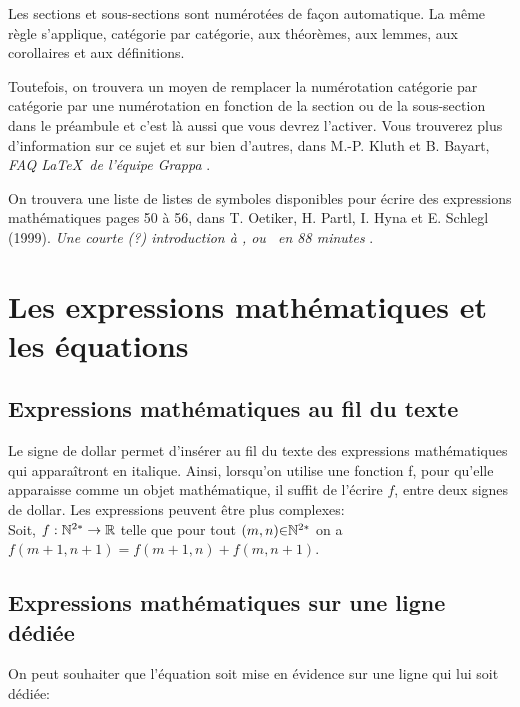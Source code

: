  
Les sections et sous-sections sont numérotées de façon automatique. La même règle s'applique, catégorie par catégorie, aux théorèmes, aux lemmes, aux corollaires et aux définitions.

Toutefois, on trouvera un moyen de remplacer la numérotation catégorie par catégorie par une numérotation en fonction de la section ou de la sous-section dans le préambule et c'est là aussi que vous devrez l'activer. Vous trouverez plus d'information sur ce sujet et sur bien d'autres, dans M.-P. Kluth et B. Bayart, {\em FAQ  \LaTeX~de l'équipe Grappa} \cite{faq}.

On trouvera une liste de listes de symboles disponibles pour écrire des expressions mathématiques pages 50 à 56, dans T. Oetiker, H. Partl, I. Hyna et E. Schlegl (1999). {\em Une courte (?) introduction à \LaTeXe, ou  \LaTeXe~en 88 minutes}  \cite{oeti}.



\section{Les expressions mathématiques et les équations}\label{sec2}

\subsection{Expressions mathématiques au fil du texte}\label{fil} 
Le signe de dollar permet d'insérer au fil du texte des expressions mathématiques qui apparaîtront en italique. Ainsi, lorsqu'on utilise une fonction f, pour qu'elle apparaisse comme un objet mathématique, il suffit de l'écrire $f$, entre deux signes de dollar. Les expressions peuvent être plus complexes:\\ Soit, $f: \Bbb{N} ^{2*} \rightarrow \Bbb{R}$ telle que pour tout $(m, n) {\in} \Bbb{N} ^{2*} $ on a $f(m+1,n+1) = f(m+1,n) + f(m,n+1)$. 


\subsection{Expressions mathématiques sur une ligne dédiée}\label{dediee} 
On peut souhaiter que l'équation soit mise en évidence sur une ligne qui lui soit dédiée:\\

